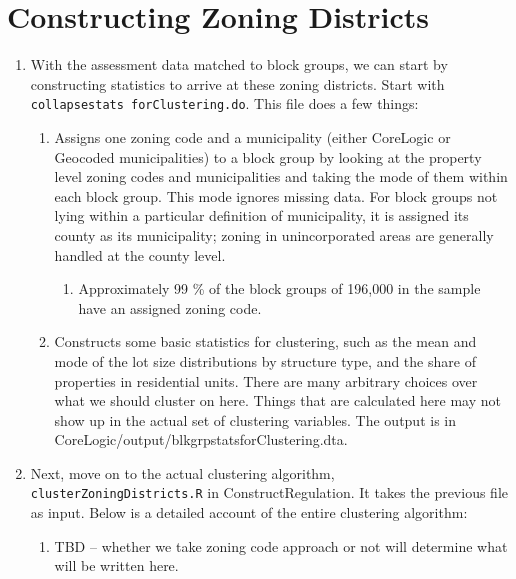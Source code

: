 \documentclass[]{article}
\begin{document}
\section{Constructing Zoning Districts}
\begin{enumerate}
	\item With the assessment data matched to block groups, we can start by constructing statistics to arrive at these zoning districts. Start with \texttt{collapse\textunderscore stats \textunderscore forClustering.do}. This file does a few things:
	\begin{enumerate}
		\item Assigns one zoning code and a municipality (either CoreLogic or Geocoded municipalities) to a block group by looking at the property level zoning codes and municipalities and taking the mode of them within each block group. This mode ignores missing data. For block groups not lying within a particular definition of municipality, it is assigned its county as its municipality; zoning in unincorporated areas are generally handled at the county level. 
		\begin{enumerate}
			\item Approximately 99 \% of the block groups of 196,000 in the sample have an assigned zoning code. 
		\end{enumerate}
		
		\item Constructs some basic statistics for clustering, such as the mean and mode of the lot size distributions by structure type, and the share of properties in residential units. There are many arbitrary choices over what we should cluster on here. Things that are calculated here may not show up in the actual set of clustering variables. The output is in CoreLogic/output/blkgrpstats\textunderscore forClustering.dta.
	\end{enumerate}

	\item Next, move on to the actual clustering algorithm, \texttt{cluster\textunderscore ZoningDistricts.R} in Construct\textunderscore Regulation. It takes the previous file as input. Below is a detailed account of the entire clustering algorithm:
	\begin{enumerate}
		\item TBD -- whether we take zoning code approach or not will determine what will be written here. 
	\end{enumerate}
\end{enumerate}
\end{document}
